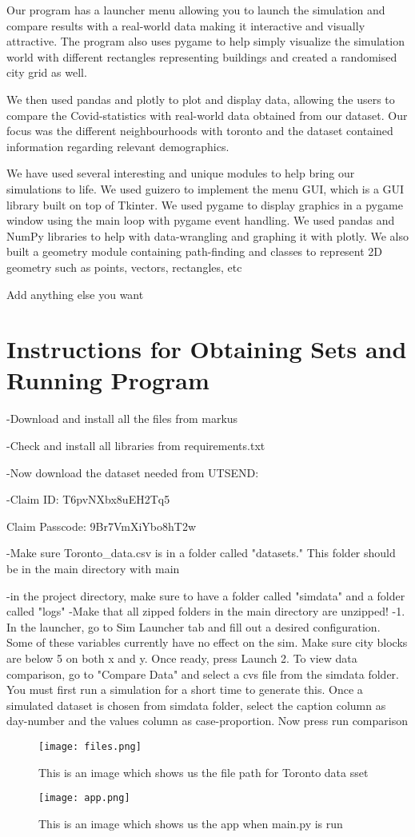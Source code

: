 \documentclass{article}
\begin{document}
Our program has a launcher menu allowing you to launch the simulation and compare results with a real-world data making it interactive and visually attractive. The program also uses pygame to help simply visualize the simulation world with different rectangles representing buildings and created a randomised city grid as well.

We then used pandas and plotly to plot and display data, allowing the users to compare the Covid-statistics with real-world data obtained from our dataset. Our focus was the different neighbourhoods with toronto and the dataset contained information regarding relevant demographics.

We have used several interesting and unique modules to help bring our simulations to life. We used guizero to implement the menu GUI, which is a GUI library built on top of Tkinter. We used pygame to display graphics in a pygame window using the main loop with pygame event handling. We used pandas and NumPy libraries to help with data-wrangling and graphing it with plotly. We also built a geometry module containing path-finding and classes to represent 2D geometry such as points, vectors, rectangles, etc

Add anything else you want
\bigskip


\section{Instructions for Obtaining Sets and Running Program}
-Download and install all the files from markus

-Check and install all libraries from requirements.txt

-Now download the dataset needed from UTSEND:

-Claim ID: T6pvNXbx8uEH2Tq5

Claim Passcode: 9Br7VmXiYbo8hT2w

-Make sure Toronto\_data.csv is in a folder called "datasets." This folder should be in the main directory with main

-in the project directory, make sure to have a folder called "simdata" and a folder called "logs"
-Make that all zipped folders in the main directory are unzipped!
-1. In the launcher, go to Sim Launcher tab and fill out a desired configuration. Some of these variables currently have no effect on the sim. Make sure city blocks are below 5 on both x and y. Once ready, press Launch
2. To view data comparison, go to "Compare Data" and select a cvs file from the simdata folder. You must first run a simulation for a short time to generate this. Once a simulated dataset is chosen from simdata folder, select the caption column as day-number and the values column as case-proportion. Now press run comparison
\begin{figure}[htbp]
{\texttt{[image: files.png]}}
\caption{This is an image which shows us the file path for Toronto data sset}
\label{fig}
\end{figure}
\begin{figure}[htbp]
{\texttt{[image: app.png]}}
\caption{This is an image which shows us the app when main.py is run}
\label{fig}
\end{figure}
\end{document}
